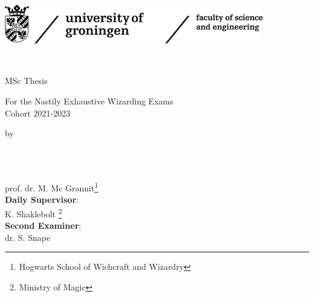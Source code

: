 \begin{titlepage}
\begin{center}

\parbox[c]{\textwidth}{\includegraphics[height=17mm]{title/logos/RUG_Logo_FSE_Black.png}}\\
  \vfill
  
\vspace*{2\bigskipamount}

{\makeatletter
\titlestyle\bfseries\LARGE\@title
\makeatother}

{\makeatletter
\ifx\@subtitle\undefined\else
    \bigskip
    \titlefont\titleshape\Large\@subtitle
\fi
\makeatother}

\bigskip
\bigskip
\vfill


{\large \titlefont MSc Thesis}

\bigskip

For the Nastily Exhaustive Wizarding Exams\\
Cohort 2021-2023

\bigskip

by

\bigskip
\bigskip

\makeatletter
{\Large\titlefont\bfseries\@firstname\ {\titleshape\@lastname}}
\makeatother
\end{center}

\bigskip
\bigskip
\bigskip
\renewcommand*{\thefootnote}{\fnsymbol{footnote}}
\setcounter{footnote}{1}
\vfill
{}\\[1ex]
            {\large prof. dr. M. Mc Grannit\footnote{Hogwarts School of Wichcraft and Wizardry}}\\[3ex]
            {\large \textbf{Daily Supervisor}:}\\[1ex]   
            {\large K. Shaklebolt \footnote{Ministry of Magic}}\\[3ex]
   {\large \textbf{Second Examiner}:}\\[1ex]
   {\large dr. S. Snape\footnotemark[2]}
%
  \vfill
\renewcommand*{\thefootnote}{\arabic{footnote}}
\setcounter{footnote}{0}
\end{titlepage}